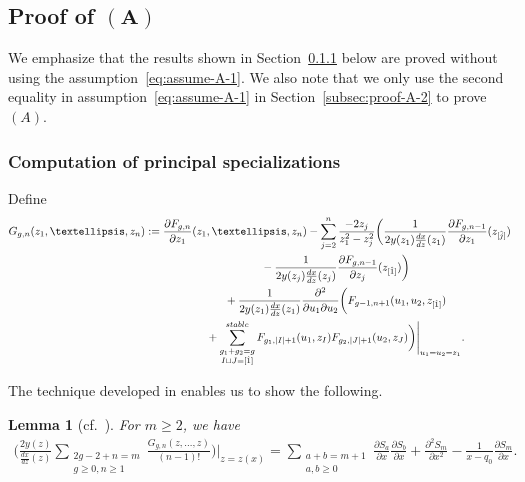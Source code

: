 \documentclass[11pt]{article}
\newtheorem{lem}[thm]{Lemma}
\theoremstyle{definition}
\numberwithin{equation}{section}
\def\p{\partial}
\begin{document}
\subsection[Proof of $(A)$]{Proof of $\boldsymbol{(A)}$}
\label{section:proof-of-A}

We emphasize that the results shown in Section~\ref{subsec:proof-A-1} below
are proved without using the assumption~\eqref{eq:assume-A-1}.
We also note that we only use the second equality
in assumption~\eqref{eq:assume-A-1} in Section~\ref{subsec:proof-A-2}
to prove~$(A)$.

\subsubsection{Computation of principal specializations}
\label{subsec:proof-A-1}

Def\/ine
\begin{gather}
G_{g,n}(z_{1},\dots,z_{n}) :=
\frac{\p F_{g,n}}{\p z_{1}}(z_{1},\dots,z_{n})-\sum_{j=2}^{n} \frac{-2z_{j}}{z_{1}^{2}-z_{j}^{2}}
\biggl( \frac{1}{2y(z_{1})\frac{dx}{dz}(z_{1})}
\frac{\p F_{g,n-1}}{\p z_{1}}(z_{[\hat{j}]})
\nonumber\\
\hphantom{G_{g,n}(z_{1},\dots,z_{n}) :=}{}
 - \frac{1}{2y(z_{j})\frac{dx}{dz}(z_{j})}
\frac{\p F_{g,n-1}}{\p z_{j}}(z_{[\hat{1}]}) \biggr)
\nonumber\\
\hphantom{G_{g,n}(z_{1},\dots,z_{n}) :=}{}
+ \frac{1}{2y(z_{1})\frac{dx}{dz}(z_{1})} \frac{\p^{2}}{\p u_{1} \p u_{2}}
\biggl( F_{g-1,n+1}(u_{1},u_{2},z_{[\hat{1}]})\nonumber\\
\hphantom{G_{g,n}(z_{1},\dots,z_{n}) :=}{}
+ \sum_{\substack{g_{1}+g_{2}=g \\ I \sqcup J = [\hat{1}]}}^{\rm stable}
F_{g_{1}, |I|+1}(u_{1},z_{I}) F_{g_{2}, |J|+1}(u_{2}, z_{J})
\biggr)\Biggr|_{u_{1}=u_{2}=z_{1}}.
\label{eq:Ggn}
\end{gather}

The technique developed in
\cite{DM14, DM14-2} enables us to show the following.

\begin{lem} [cf.~]
\label{prop:partial-Riccati}
For $m \ge 2$, we have
\begin{gather} \label{eq:partial-Riccati}
\Biggl(\frac{2y(z)}{\frac{dx}{dz}(z)}
\sum_{\substack{2g-2+n=m \\ g\ge0, n\ge 1}}
\frac{G_{g,n}(z,\dots,z)}{(n-1)!} \Biggr)\Biggl|_{z=z(x)} =
\sum_{\substack{a+b=m+1 \\ a,b \ge 0}}
\frac{\p S_{a}}{\p x} \frac{\p S_{b}}{\p x} +
\frac{\p^{2} S_{m}}{\p x^{2}} - \frac{1}{x-q_{0}} \frac{\p S_{m}}{\p x}.
\end{gather}
\end{lem}
\end{document}
